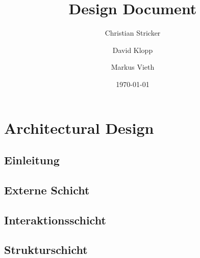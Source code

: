 \documentclass{book}
\title{Design Document}
\author{Christian Stricker \and David Klopp \and Markus Vieth}
\date{\today}
\begin{document}
\frontmatter
\maketitle
\tableofcontents
\mainmatter


\part{Architectural Design}

\chapter{Einleitung}

 
\chapter{Externe Schicht}


\chapter{Interaktionsschicht}


\chapter{Strukturschicht}

 
\end{document}
